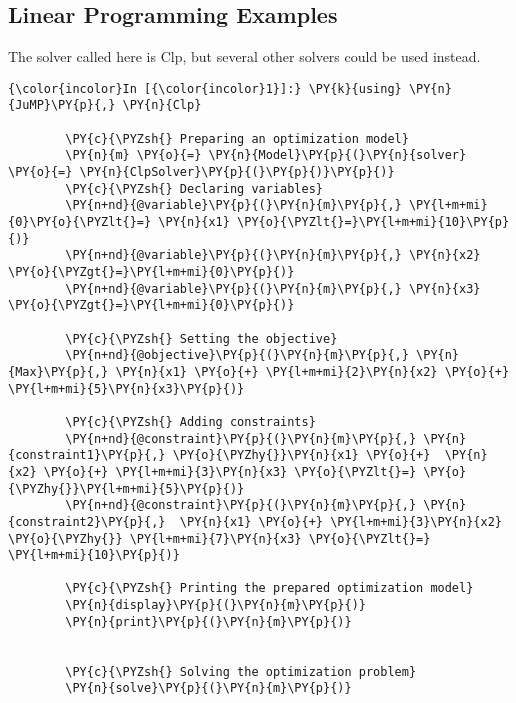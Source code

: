 \subsection{Linear Programming Examples}

    The solver called here is Clp, but several other solvers could be used
instead.

    \begin{Verbatim}[commandchars=\\\{\}]
{\color{incolor}In [{\color{incolor}1}]:} \PY{k}{using} \PY{n}{JuMP}\PY{p}{,} \PY{n}{Clp}
        
        \PY{c}{\PYZsh{} Preparing an optimization model}
        \PY{n}{m} \PY{o}{=} \PY{n}{Model}\PY{p}{(}\PY{n}{solver} \PY{o}{=} \PY{n}{ClpSolver}\PY{p}{(}\PY{p}{)}\PY{p}{)}
        \PY{c}{\PYZsh{} Declaring variables}
        \PY{n+nd}{@variable}\PY{p}{(}\PY{n}{m}\PY{p}{,} \PY{l+m+mi}{0}\PY{o}{\PYZlt{}=} \PY{n}{x1} \PY{o}{\PYZlt{}=}\PY{l+m+mi}{10}\PY{p}{)}
        \PY{n+nd}{@variable}\PY{p}{(}\PY{n}{m}\PY{p}{,} \PY{n}{x2} \PY{o}{\PYZgt{}=}\PY{l+m+mi}{0}\PY{p}{)}
        \PY{n+nd}{@variable}\PY{p}{(}\PY{n}{m}\PY{p}{,} \PY{n}{x3} \PY{o}{\PYZgt{}=}\PY{l+m+mi}{0}\PY{p}{)}
        
        \PY{c}{\PYZsh{} Setting the objective}
        \PY{n+nd}{@objective}\PY{p}{(}\PY{n}{m}\PY{p}{,} \PY{n}{Max}\PY{p}{,} \PY{n}{x1} \PY{o}{+} \PY{l+m+mi}{2}\PY{n}{x2} \PY{o}{+} \PY{l+m+mi}{5}\PY{n}{x3}\PY{p}{)}
        
        \PY{c}{\PYZsh{} Adding constraints}
        \PY{n+nd}{@constraint}\PY{p}{(}\PY{n}{m}\PY{p}{,} \PY{n}{constraint1}\PY{p}{,} \PY{o}{\PYZhy{}}\PY{n}{x1} \PY{o}{+}  \PY{n}{x2} \PY{o}{+} \PY{l+m+mi}{3}\PY{n}{x3} \PY{o}{\PYZlt{}=} \PY{o}{\PYZhy{}}\PY{l+m+mi}{5}\PY{p}{)}
        \PY{n+nd}{@constraint}\PY{p}{(}\PY{n}{m}\PY{p}{,} \PY{n}{constraint2}\PY{p}{,}  \PY{n}{x1} \PY{o}{+} \PY{l+m+mi}{3}\PY{n}{x2} \PY{o}{\PYZhy{}} \PY{l+m+mi}{7}\PY{n}{x3} \PY{o}{\PYZlt{}=} \PY{l+m+mi}{10}\PY{p}{)}
        
        \PY{c}{\PYZsh{} Printing the prepared optimization model}
        \PY{n}{display}\PY{p}{(}\PY{n}{m}\PY{p}{)}
        \PY{n}{print}\PY{p}{(}\PY{n}{m}\PY{p}{)}
        
        
        \PY{c}{\PYZsh{} Solving the optimization problem}
        \PY{n}{solve}\PY{p}{(}\PY{n}{m}\PY{p}{)}
        

\end{Verbatim}

